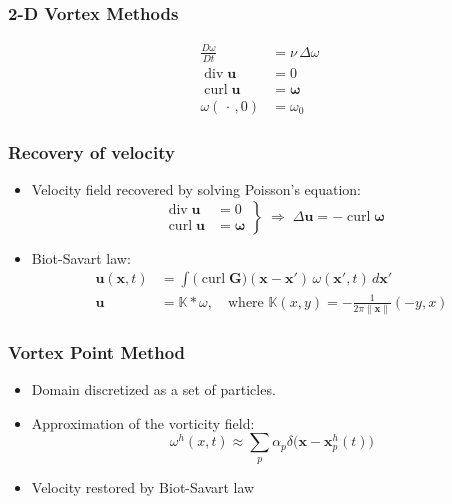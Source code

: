 \documentclass[12pt,english]{beamer}
\newcommand{\K}{\mathbb{K}}  %
\renewcommand{\vec}{\mathbf}
\newcommand{\x}{\vec x}      %
\newcommand{\vel}{\vec u}    %
\DeclareMathOperator{\divergence}{div}
\DeclareMathOperator{\curl}{curl}
\providecommand{\norm}[1]{\lVert#1\rVert}
\newcommand{\md}[2]{\frac{D#1}{D#2}}
\begin{document}
  \begin{frame}
    \frametitle{2-D Vortex Methods}
    \begin{align}
      \md{ω}{t} &= ν\,Δω \\
      \divergence\vel &= 0 \\
      \curl\vel &= \mathbold\omega \\
      ω(\,\cdot\,, 0) &= ω_0
    \end{align}
  \end{frame}

  \begin{frame}
    \frametitle{Recovery of velocity}
    \begin{itemize}
      \item Velocity field recovered by solving Poisson's equation:
        \begin{equation}
          \left.
          \begin{split}
            \divergence\vel &= 0 \\
            \curl\vel &= \mathbold\omega
          \end{split}
          \right\}\;\Longrightarrow\;
          Δ\vel = -\curl\mathbold\omega
        \end{equation}
      \item Biot-Savart law:
        \begin{align}
          \vel(\x, t) &=
            \int\bigl(\curl\vec{G}\bigr)(\x - \x')\,ω(\x', t)\,d\x' \\
          \vel &= \K * ω,
            \quad\text{where \(\textstyle\K(x, y) = -\frac{1}{2π\norm{\x}}(-y, x)\)}
        \end{align}
    \end{itemize}
  \end{frame}

  \begin{frame}
    \frametitle{Vortex Point Method}
    \begin{itemize}
      \item Domain discretized as a set of particles.
      \item Approximation of the vorticity field:
        \begin{equation}
          ω^h(x, t) \approx\sum_p α_p δ\bigl(\x - \x^h_p(t)\bigr)
        \end{equation}
      \item Velocity restored by Biot-Savart law
    \end{itemize}
  \end{frame}
\end{document}
